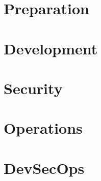 



\frontmatter{}


%

\tableofcontents
\listoffigures
\listoftables

\mainmatter{}


\part{Preparation} %



\part{Development} %







\part{Security} %



\part{Operations} %






\part{DevSecOps} %


\backmatter{}
\printindex
\nocite{*}





